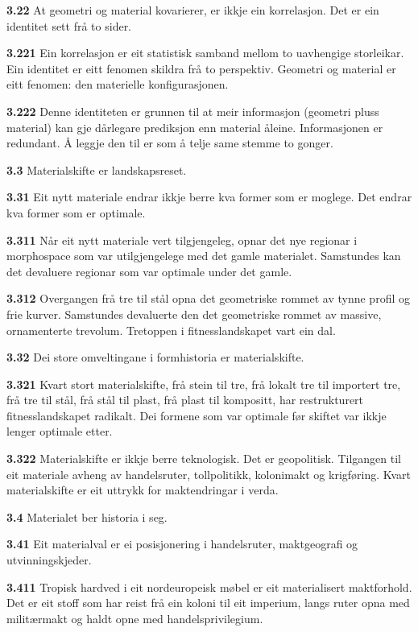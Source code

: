 \documentclass[11pt, a4paper]{article}
\newcommand{\subprop}[1]{\medskip\noindent\textbf{#1}\quad}
\begin{document}
\subprop{3.22} At geometri og material kovarierer, er ikkje ein korrelasjon. Det er ein identitet sett fr\aa{} to sider.

\subprop{3.221} Ein korrelasjon er eit statistisk samband mellom to uavhengige storleikar. Ein identitet er eitt fenomen skildra fr\aa{} to perspektiv. Geometri og material er eitt fenomen: den materielle konfigurasjonen.

\subprop{3.222} Denne identiteten er grunnen til at meir informasjon (geometri pluss material) kan gje d\aa rlegare prediksjon enn material \aa leine. Informasjonen er redundant. \AA{} leggje den til er som \aa{} telje same stemme to gonger.

\subprop{3.3} Materialskifte er landskapsreset.

\subprop{3.31} Eit nytt materiale endrar ikkje berre kva former som er moglege. Det endrar kva former som er optimale.

\subprop{3.311} N\aa r eit nytt materiale vert tilgjengeleg, opnar det nye regionar i morphospace som var utilgjengelege med det gamle materialet. Samstundes kan det devaluere regionar som var optimale under det gamle.

\subprop{3.312} Overgangen fr\aa{} tre til st\aa l opna det geometriske rommet av tynne profil og frie kurver. Samstundes devaluerte den det geometriske rommet av massive, ornamenterte trevolum. Tretoppen i fitnesslandskapet vart ein dal.

\subprop{3.32} Dei store omveltingane i formhistoria er materialskifte.

\subprop{3.321} Kvart stort materialskifte, fr\aa{} stein til tre, fr\aa{} lokalt tre til importert tre, fr\aa{} tre til st\aa l, fr\aa{} st\aa l til plast, fr\aa{} plast til kompositt, har restrukturert fitnesslandskapet radikalt. Dei formene som var optimale f\o r skiftet var ikkje lenger optimale etter.

\subprop{3.322} Materialskifte er ikkje berre teknologisk. Det er geopolitisk. Tilgangen til eit materiale avheng av handelsruter, tollpolitikk, kolonimakt og krigf\o ring. Kvart materialskifte er eit uttrykk for maktendringar i verda.

\subprop{3.4} Materialet ber historia i seg.

\subprop{3.41} Eit materialval er ei posisjonering i handelsruter, maktgeografi og utvinningskjeder.

\subprop{3.411} Tropisk hardved i eit nordeuropeisk m\o bel er eit materialisert maktforhold. Det er eit stoff som har reist fr\aa{} ein koloni til eit imperium, langs ruter opna med milit\ae rmakt og haldt opne med handelsprivilegium.
\end{document}
